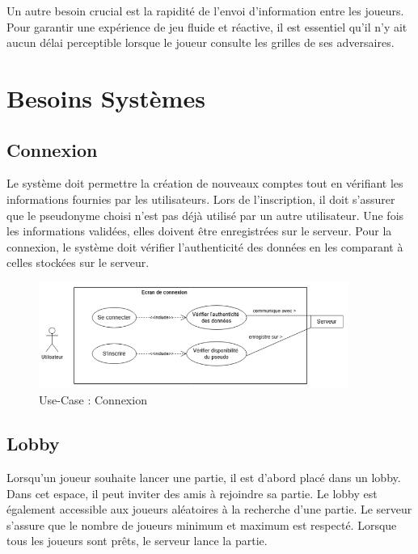 \documentclass{report}
\begin{document}
\noindent Un autre besoin crucial est la rapidité de l’envoi d’information entre les joueurs. Pour garantir une expérience de jeu fluide et réactive, il est essentiel qu’il n’y ait aucun délai perceptible lorsque le joueur consulte les grilles de ses adversaires.



\chapter{Besoins Systèmes}
\label{chap:sys_req}

\section{Connexion}

\noindent Le système doit permettre la création de nouveaux comptes tout en vérifiant les informations fournies par les utilisateurs. Lors de l'inscription, il doit s'assurer que le pseudonyme choisi n'est pas déjà utilisé par un autre utilisateur. Une fois les informations validées, elles doivent être enregistrées sur le serveur. Pour la connexion, le système doit vérifier l'authenticité des données en les comparant à celles stockées sur le serveur.

\vspace{-1em}

\begin{figure}[H]
    \centering
     \includegraphics[width=0.9\textwidth, keepaspectratio]{src/sys_req/connexion.png}
    \caption{Use-Case : Connexion}
    \label{fig:use_case_connexion_sys_req}
\end{figure}

\section{Lobby}

\noindent Lorsqu'un joueur souhaite lancer une partie, il est d'abord placé dans un lobby. Dans cet espace, il peut inviter des amis à rejoindre sa partie. Le lobby est également accessible aux joueurs aléatoires à la recherche d'une partie. Le serveur s'assure que le nombre de joueurs minimum et maximum est respecté. Lorsque tous les joueurs sont prêts, le serveur lance la partie.
\end{document}
